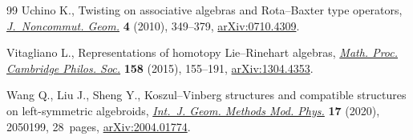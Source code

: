 \documentclass[pdftex]{sigma}%
\numberwithin{equation}{section}
\begin{document}
\begin{thebibliography}{99}
Uchino K., Twisting on associative algebras and {R}ota--{B}axter type
 operators, \href{https://doi.org/10.4171/jncg/59}{\textit{J.~Noncommut. Geom.}} \textbf{4} (2010), 349--379,
 \href{https://arxiv.org/abs/0710.4309}{arXiv:0710.4309}.

Vitagliano L., Representations of homotopy {L}ie--{R}inehart algebras,
 \href{https://doi.org/10.1017/S0305004114000541}{\textit{Math. Proc. Cambridge Philos. Soc.}} \textbf{158} (2015), 155--191,
 \href{https://arxiv.org/abs/1304.4353}{arXiv:1304.4353}.

Wang Q., Liu J., Sheng Y., Koszul--{V}inberg structures and compatible
 structures on left-symmetric algebroids, \href{https://doi.org/10.1142/S0219887820501996}{\textit{Int.~J. Geom. Methods Mod.
 Phys.}} \textbf{17} (2020), 2050199, 28~pages, \href{https://arxiv.org/abs/2004.01774}{arXiv:2004.01774}.

\end{thebibliography}\LastPageEnding
\end{document}

